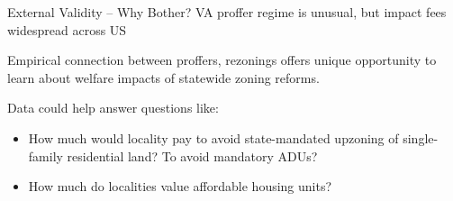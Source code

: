\documentclass[10pt]{beamer}
\begin{document}
\begin{frame}{External Validity -- Why Bother?}
VA proffer regime is unusual, but impact fees widespread across US

\vspace{2em}
Empirical connection between proffers, rezonings offers unique opportunity to learn about welfare impacts of statewide zoning reforms.

\vspace{2em}
Data could help answer questions like:
\begin{itemize}
    \item How much would locality pay to avoid state-mandated upzoning of single-family residential land? To avoid mandatory ADUs?
    \item How much do localities value affordable housing units?
\end{itemize}

\end{frame}
\end{document}
